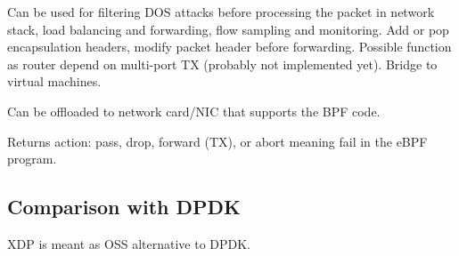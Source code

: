 Can be used for filtering DOS attacks before processing the packet in network stack, load balancing and forwarding, flow sampling and monitoring.
Add or pop encapsulation headers, modify packet header before forwarding.
Possible function as router depend on multi-port TX (probably not implemented yet).
Bridge to virtual machines.

Can be offloaded to network card/NIC that supports the BPF code.

Returns action: pass, drop, forward (TX), or abort meaning fail in the eBPF program.


\subsection{Comparison with DPDK}
XDP is meant as OSS alternative to DPDK.
